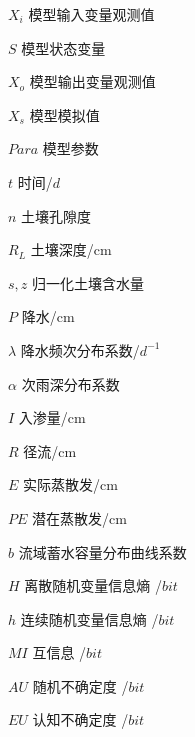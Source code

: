 \begin{denotation}

\item[$X_i$] 模型输入变量观测值
\item[$S$]   模型状态变量
\item[$X_o$] 模型输出变量观测值
\item[$X_s$] 模型模拟值
\item[$Para$] 模型参数

\item[$t$] 时间/$d$

\item[$n$] 土壤孔隙度
\item[$R_{L}$] 土壤深度/cm
\item[$s,z$] 归一化土壤含水量
\item[$P$] 降水/cm
\item[$\lambda$] 降水频次分布系数/$d^{-1}$
\item[$\alpha$] 次雨深分布系数
\item[$I$] 入渗量/cm
\item[$R$] 径流/cm
\item[$E$] 实际蒸散发/cm
\item[$PE$] 潜在蒸散发/cm
\item[$b$] 流域蓄水容量分布曲线系数


\item[$H$] 离散随机变量信息熵 /$bit$
\item[$h$] 连续随机变量信息熵 /$bit$
\item[$MI$] 互信息 /$bit$
\item[$AU$] 随机不确定度 /$bit$
\item[$EU$] 认知不确定度 /$bit$


\end{denotation}